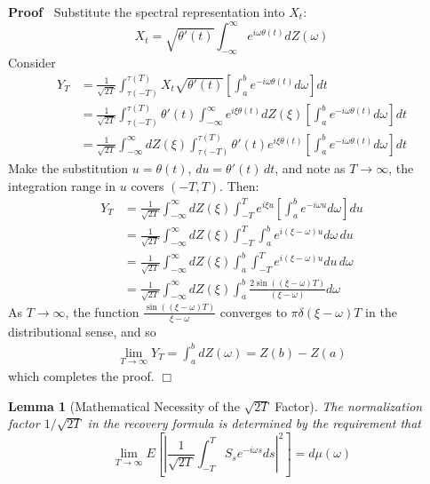 \documentclass{article}
\newenvironment{proof}{\noindent\textbf{Proof\ }}{\hspace*{\fill}$\Box$\medskip}
\newtheorem{lemma}{Lemma}
\begin{document}
\begin{proof}
  Substitute the spectral representation into $X_t$:
  \begin{equation}
    X_t = \sqrt{\theta'(t)} \int_{-\infty}^\infty e^{i\omega\theta(t)} dZ(\omega)
  \end{equation}
  Consider
  \begin{align}
    Y_T &= \frac{1}{\sqrt{2T}} \int_{\tau(-T)}^{\tau(T)} X_t \sqrt{\theta'(t)} \left[ \int_a^b e^{-i\omega\theta(t)} d\omega \right] dt \\
    &= \frac{1}{\sqrt{2T}} \int_{\tau(-T)}^{\tau(T)} \theta'(t) \int_{-\infty}^\infty e^{i\xi\theta(t)} dZ(\xi) \left[ \int_a^b e^{-i\omega\theta(t)} d\omega \right] dt\\
    &= \frac{1}{\sqrt{2T}} \int_{-\infty}^\infty dZ(\xi)\int_{\tau(-T)}^{\tau(T)} \theta'(t) e^{i\xi\theta(t)} \left[ \int_a^b e^{-i\omega\theta(t)} d\omega \right] dt
  \end{align}
  Make the substitution $u = \theta(t)$, $du = \theta'(t)\,dt$, and note as $T\to\infty$, the integration range in $u$ covers $(-T,T)$. Then:
  \begin{align}
    Y_T &= \frac{1}{\sqrt{2T}} \int_{-\infty}^\infty dZ(\xi) \int_{-T}^T e^{i\xi u} \left[ \int_a^b e^{-i\omega u} d\omega \right] du\\
    &= \frac{1}{\sqrt{2T}} \int_{-\infty}^\infty dZ(\xi) \int_{-T}^T \int_a^b e^{i(\xi-\omega)u} d\omega\, du\\
    &= \frac{1}{\sqrt{2T}} \int_{-\infty}^\infty dZ(\xi) \int_a^b \int_{-T}^T e^{i(\xi-\omega)u} du\, d\omega\\
    &= \frac{1}{\sqrt{2T}} \int_{-\infty}^\infty dZ(\xi) \int_a^b \frac{2\sin((\xi-\omega)T)}{(\xi-\omega)} d\omega
  \end{align}
  As $T \to \infty$, the function $\frac{\sin((\xi-\omega)T)}{\xi-\omega}$ converges to $\pi\delta(\xi-\omega) T$ in the distributional sense, and so
  \begin{align}
    \lim_{T \to \infty} Y_T = \int_a^b dZ(\omega) = Z(b) - Z(a)
  \end{align}
  which completes the proof.
\end{proof}

\begin{lemma}
  [Mathematical Necessity of the $\sqrt{2T}$ Factor] The normalization factor $1 / \sqrt{2T}$ in the recovery formula is determined by the requirement that
  \begin{equation}
    \lim_{T \to \infty} E \left[ \left| \frac{1}{\sqrt{2T}} \int_{-T}^T S_s e^{-i\omega s} ds \right|^2 \right] = d\mu(\omega)
  \end{equation}
\end{lemma}
\end{document}
